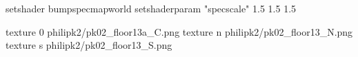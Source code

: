 setshader bumpspecmapworld
setshaderparam "specscale" 1.5 1.5 1.5

texture 0 philipk2/pk02_floor13a_C.png
texture n philipk2/pk02_floor13_N.png
texture s philipk2/pk02_floor13_S.png


